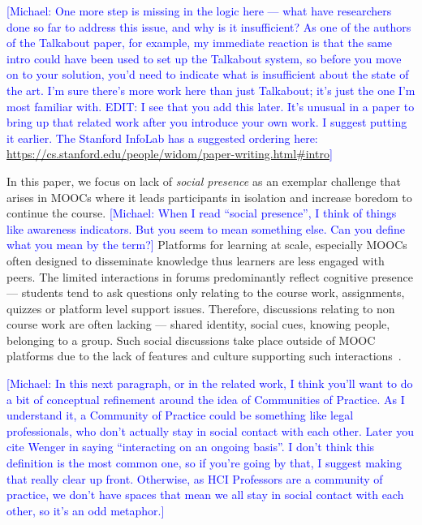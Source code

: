 \documentclass[format=acmsmall, review=false, screen=true]{acmart}
\newcommand{\msb}[1]{{\textcolor{blue}{ [Michael: #1]}}}
\begin{document}
\msb{One more step is missing in the logic here --- what have researchers done so far to address this issue, and why is it insufficient? As one of the authors of the Talkabout paper, for example, my immediate reaction is that the same intro could have been used to set up the Talkabout system, so before you move on to your solution, you'd need to indicate what is insufficient about the state of the art. I'm sure there's more work here than just Talkabout; it's just the one I'm most familiar with. EDIT: I see that you add this later. It's unusual in a paper to bring up that related work after you introduce your own work. I suggest putting it earlier. The Stanford InfoLab has a suggested ordering here: \url{https://cs.stanford.edu/people/widom/paper-writing.html#intro}}

In this paper, we focus on lack of \textit{social presence} as an exemplar challenge that arises in MOOCs where it leads participants in isolation and increase boredom to continue the course. \msb{When I read ``social presence'', I think of things like awareness indicators. But you seem to mean something else. Can you define what you mean by the term?} Platforms for learning at scale, especially MOOCs often designed to disseminate knowledge thus learners are less engaged with peers. The limited interactions in forums predominantly reflect cognitive presence --- students tend to ask questions only relating to the course work, assignments, quizzes or platform level support issues. Therefore, discussions relating to non course work are often lacking --- shared identity, social cues, knowing people, belonging to a group. Such social discussions take place outside of MOOC platforms due to the lack of features and culture supporting such interactions~\cite{veletsianos2015digging}. 

\msb{In this next paragraph, or in the related work, I think you'll want to do a bit of conceptual refinement around the idea of Communities of Practice. As I understand it, a Community of Practice could be something like legal professionals, who don't actually stay in social contact with each other. Later you cite Wenger in saying ``interacting on an ongoing basis''. I don't think this definition is the most common one, so if you're going by that, I suggest making that really clear up front. Otherwise, as HCI Professors are a community of practice, we don't have spaces that mean we all stay in social contact with each other, so it's an odd metaphor.}
\end{document}
